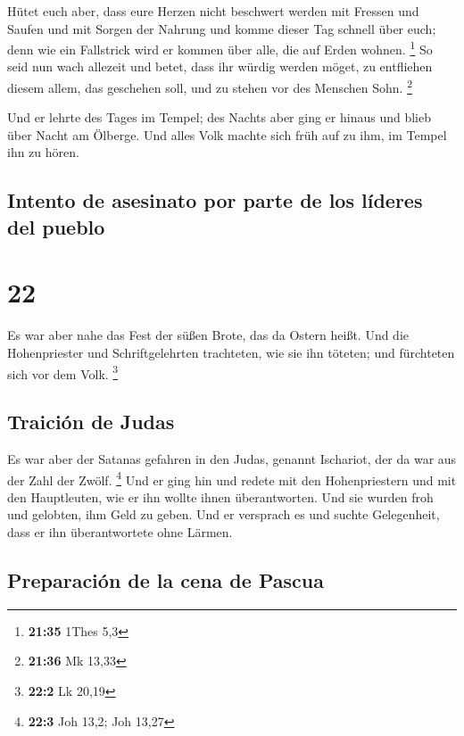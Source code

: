  Hütet euch aber, dass eure Herzen nicht beschwert werden
mit Fressen und Saufen und mit Sorgen der Nahrung und komme dieser Tag
schnell über euch;  denn wie ein Fallstrick wird er
kommen über alle, die auf Erden wohnen. \footnote{\textbf{21:35} 1Thes
  5,3}  So seid nun wach allezeit und betet, dass ihr
würdig werden möget, zu entfliehen diesem allem, das geschehen soll, und
zu stehen vor des Menschen Sohn. \footnote{\textbf{21:36} Mk 13,33}

 Und er lehrte des Tages im Tempel; des Nachts aber ging
er hinaus und blieb über Nacht am Ölberge.  Und alles
Volk machte sich früh auf zu ihm, im Tempel ihn zu hören.

\hypertarget{intento-de-asesinato-por-parte-de-los-luxedderes-del-pueblo}{%
\subsection{Intento de asesinato por parte de los líderes del
pueblo}\label{intento-de-asesinato-por-parte-de-los-luxedderes-del-pueblo}}

\hypertarget{section-21}{%
\section{22}\label{section-21}}

 Es war aber nahe das Fest der süßen Brote, das da Ostern
heißt.  Und die Hohenpriester und Schriftgelehrten
trachteten, wie sie ihn töteten; und fürchteten sich vor dem Volk.
\footnote{\textbf{22:2} Lk 20,19}

\hypertarget{traiciuxf3n-de-judas}{%
\subsection{Traición de Judas}\label{traiciuxf3n-de-judas}}

 Es war aber der Satanas gefahren in den Judas, genannt
Ischariot, der da war aus der Zahl der Zwölf. \footnote{\textbf{22:3}
  Joh 13,2; Joh 13,27}  Und er ging hin und redete mit den
Hohenpriestern und mit den Hauptleuten, wie er ihn wollte ihnen
überantworten.  Und sie wurden froh und gelobten, ihm Geld
zu geben.  Und er versprach es und suchte Gelegenheit,
dass er ihn überantwortete ohne Lärmen.

\hypertarget{preparaciuxf3n-de-la-cena-de-pascua}{%
\subsection{Preparación de la cena de
Pascua}\label{preparaciuxf3n-de-la-cena-de-pascua}}

